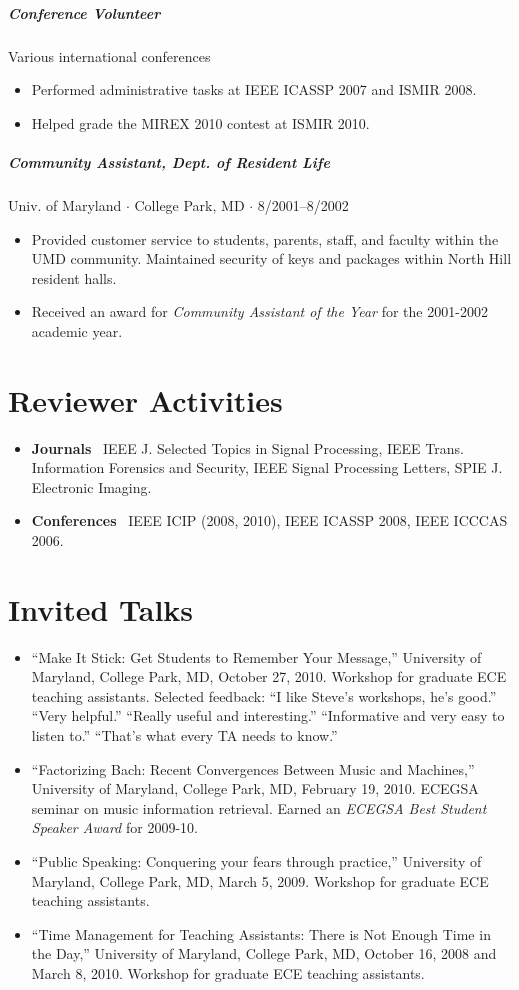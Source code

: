 \documentclass[10pt,letterpaper]{article}
\begin{document}
\subparagraph{Conference Volunteer}
Various international conferences
\begin{itemize}
\item Performed administrative tasks at IEEE ICASSP 2007 and ISMIR 2008.
\item Helped grade the MIREX 2010 contest at ISMIR 2010.
\end{itemize}

\subparagraph{Community Assistant, Dept. of Resident Life}
Univ. of Maryland $\cdot$ College Park, MD $\cdot$ 8/2001--8/2002
\begin{itemize}
    \item Provided customer service to students, parents, staff, and faculty within the UMD community. Maintained security of keys and packages within North Hill resident halls.
    \item Received an award for \textit{Community Assistant of the Year} for the 2001-2002 academic year.

\end{itemize}

\section*{Reviewer Activities}

\begin{itemize}
	\item \textbf{Journals} \ IEEE J. Selected Topics in Signal Processing, IEEE Trans. Information Forensics and Security, IEEE Signal Processing Letters, SPIE J. Electronic Imaging.
    \item \textbf{Conferences} \ IEEE ICIP (2008, 2010), IEEE ICASSP 2008, IEEE ICCCAS 2006.
\end{itemize}


\section*{Invited Talks}

\begin{itemize}
\item ``Make It Stick: Get Students to Remember Your Message,'' University of Maryland, College Park, MD, October 27, 2010. Workshop for graduate ECE teaching assistants. Selected feedback: ``I like Steve's workshops, he's good.'' ``Very helpful.'' ``Really useful and interesting.'' ``Informative and very easy to listen to.'' ``That's what every TA needs to know.''
\item ``Factorizing Bach: Recent Convergences Between Music and Machines,'' University of Maryland, College Park, MD, February 19, 2010. ECEGSA seminar on music information retrieval. Earned an \textit{ECEGSA Best Student Speaker Award} for 2009-10.
\item ``Public Speaking: Conquering your fears through practice,'' University of Maryland, College Park, MD, March 5, 2009. Workshop for graduate ECE teaching assistants.
\item ``Time Management for Teaching Assistants: There is Not Enough Time in the Day,'' University of Maryland, College Park, MD, October 16, 2008 and March 8, 2010. Workshop for graduate ECE teaching assistants.
\end{itemize}
\end{document}
